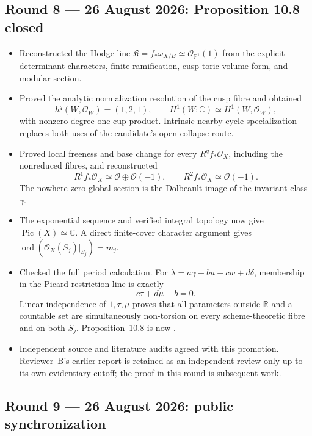 \subsection*{Round 8 --- 26 August 2026: Proposition 10.8 closed}

\begin{itemize}[leftmargin=1.8em]
\item Reconstructed the Hodge line
\(\mathfrak K=f_*\omega_{X/B}\simeq\mathcal O_{\mathbb P^1}(1)\)
from the explicit determinant characters, finite ramification, cusp toric
volume form, and modular section.
\item Proved the analytic normalization resolution of the cusp fibre and
obtained
\[
h^q(W,\mathcal O_W)=(1,2,1),\qquad
H^1(W;\mathbb C)\simeq H^1(W,\mathcal O_W),
\]
with nonzero degree-one cup product.  Intrinsic nearby-cycle
specialization replaces both uses of the candidate's open collapse route.
\item Proved local freeness and base change for every
\(R^qf_*\mathcal O_X\), including the nonreduced fibres, and reconstructed
\[
R^1f_*\mathcal O_X\simeq\mathcal O\oplus\mathcal O(-1),\qquad
R^2f_*\mathcal O_X\simeq\mathcal O(-1).
\]
The nowhere-zero global section is the Dolbeault image of the invariant
class \(\gamma\).
\item The exponential sequence and verified integral topology now give
\(\operatorname{Pic}(X)\simeq\mathbb C\).  A direct finite-cover character
argument gives
\(\operatorname{ord}(\mathcal O_X(S_j)|_{S_j})=m_j\).
\item Checked the full period calculation.  For
\(\lambda=a\gamma+bu+cw+d\delta\), membership in the Picard restriction
line is exactly
\[
c\tau+d\mu-b=0.
\]
Linear independence of \(1,\tau,\mu\) proves that all parameters outside
\(\mathbb R\) and a countable set are simultaneously non-torsion on every
scheme-theoretic fibre and on both \(S_j\).  Proposition~10.8 is now
\Verified.
\item Independent source and literature audits agreed with this promotion.
Reviewer~B's earlier report is retained as an independent review only up
to its own evidentiary cutoff; the proof in this round is subsequent work.
\end{itemize}

\subsection*{Round 9 --- 26 August 2026: public synchronization}

